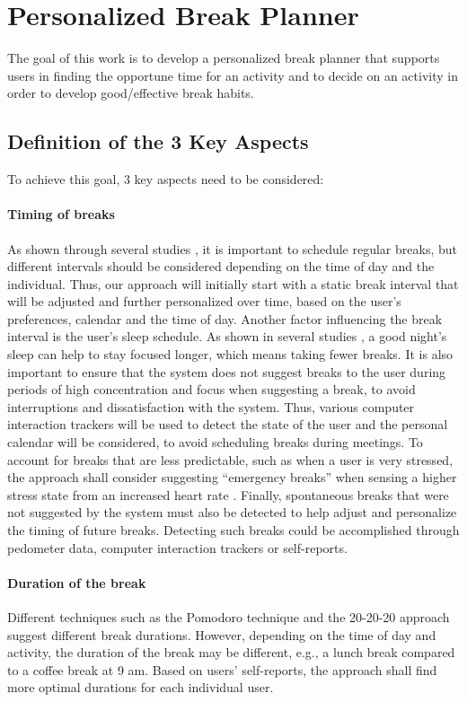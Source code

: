 \documentclass{hasel_thesis}
\begin{document}
\chapter{Personalized Break Planner}
The goal of this work is to develop a personalized break planner that supports users in finding the opportune   time for an activity and to decide on an activity in order to develop good/effective break habits. 

\section{Definition of the 3 Key Aspects}
To achieve this goal, 3 key aspects need to be considered:

\subsubsection{Timing of breaks}
As shown through several studies \cite{Largo-Wight.2017} \cite{KimS.ParkY.&Niu.2017}, it is important to schedule regular breaks, but different intervals should be considered depending on the time of day \cite{KimS.ParkY.&Niu.2017} and the individual. Thus, our approach will initially start with a static break interval that will be adjusted and further personalized over time, based on the user's preferences, calendar and the time of day. Another factor influencing the break interval is the user's sleep schedule. As shown in several studies \cite{Rosekind.2010} \cite{Gingerich.2017} \cite{Choi.2018}, a good night's sleep  can help to stay focused longer, which means taking fewer breaks. 
It is also important to ensure that the system does not suggest breaks to the user during periods of high concentration and focus when suggesting a break, to avoid interruptions and dissatisfaction with the system. Thus, various computer interaction trackers will be used to detect the state of the user and the personal calendar will be considered, to avoid scheduling breaks during meetings. 
To account for breaks that are less predictable, such as when a user is very stressed, the approach shall consider suggesting “emergency breaks” when sensing a higher stress state from an increased heart rate \cite{Hjortskov.2004}. 
Finally, spontaneous breaks that were not suggested by the system must also be detected to help adjust and personalize the timing of future breaks. Detecting such breaks could be accomplished through pedometer data, computer interaction trackers or self-reports. 

\subsubsection{Duration of the break}
Different techniques such as the Pomodoro technique and the 20-20-20 approach suggest different break durations. However, depending on the time of day and activity, the duration of the break may be different, e.g., a lunch break compared to a coffee break at 9 am. Based on users’ self-reports, the approach shall find more optimal durations for each individual user.  
\end{document}
